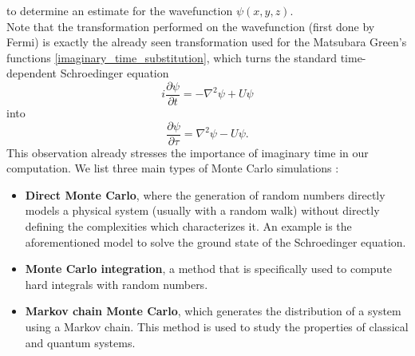 to determine an estimate for the wavefunction $\psi(x,y,z)$.\\
Note that the transformation performed on the wavefunction (first done by Fermi) is exactly the already seen transformation used for the Matsubara Green's 
functions \ref{imaginary_time_substitution}, which turns the standard time-dependent Schroedinger equation
\begin{equation}
    i\frac{\partial \psi}{\partial t}=-\nabla^2\psi+U\psi
\end{equation}
into
\begin{equation}
    \frac{\partial\psi}{\partial \tau}=\nabla^2\psi-U\psi.
\end{equation}
This observation already stresses the importance of imaginary time in our computation.
We list three main types of Monte Carlo simulations \cite{thijssen2007computational}:
\begin{itemize}
    \item \textbf{Direct Monte Carlo}, where the generation of random numbers directly models a physical system (usually with a random walk) 
    without directly defining the complexities which characterizes it. An example is the aforementioned model to solve the ground state of 
    the Schroedinger equation.
    \item \textbf{Monte Carlo integration}, a method that is specifically used to compute hard integrals with random numbers.
    \item \textbf{Markov chain Monte Carlo}, which generates the distribution of a system using a Markov chain. This method is used to study the properties of classical and quantum systems.
\end{itemize}
